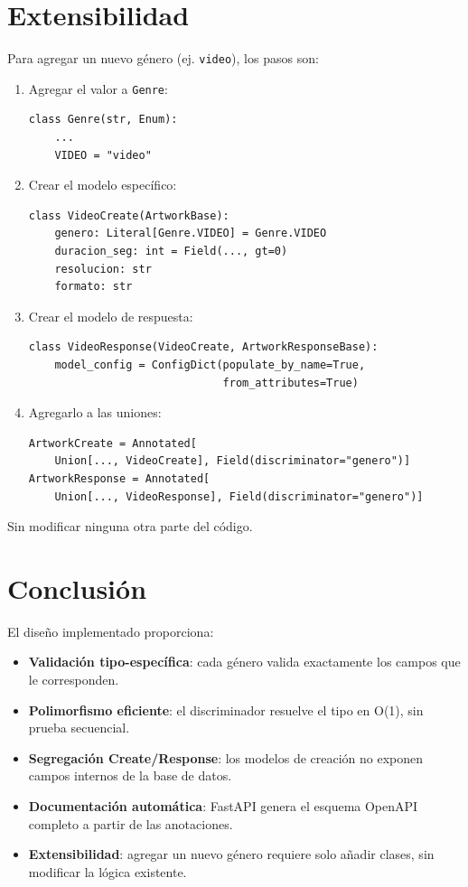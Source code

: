 \documentclass[12pt,a4paper]{article}
\begin{document}
\section{Extensibilidad}

Para agregar un nuevo género (ej. \texttt{video}), los pasos son:

\begin{enumerate}
    \item Agregar el valor a \texttt{Genre}:
\begin{lstlisting}
class Genre(str, Enum):
    ...
    VIDEO = "video"
\end{lstlisting}
    \item Crear el modelo específico:
\begin{lstlisting}
class VideoCreate(ArtworkBase):
    genero: Literal[Genre.VIDEO] = Genre.VIDEO
    duracion_seg: int = Field(..., gt=0)
    resolucion: str
    formato: str
\end{lstlisting}
    \item Crear el modelo de respuesta:
\begin{lstlisting}
class VideoResponse(VideoCreate, ArtworkResponseBase):
    model_config = ConfigDict(populate_by_name=True,
                              from_attributes=True)
\end{lstlisting}
    \item Agregarlo a las uniones:
\begin{lstlisting}
ArtworkCreate = Annotated[
    Union[..., VideoCreate], Field(discriminator="genero")]
ArtworkResponse = Annotated[
    Union[..., VideoResponse], Field(discriminator="genero")]
\end{lstlisting}
\end{enumerate}

Sin modificar ninguna otra parte del código.

\section{Conclusión}

El diseño implementado proporciona:

\begin{itemize}
    \item \textbf{Validación tipo-específica}: cada género valida exactamente
          los campos que le corresponden.
    \item \textbf{Polimorfismo eficiente}: el discriminador resuelve el tipo
          en O(1), sin prueba secuencial.
    \item \textbf{Segregación Create/Response}: los modelos de creación no
          exponen campos internos de la base de datos.
    \item \textbf{Documentación automática}: FastAPI genera el esquema
          OpenAPI completo a partir de las anotaciones.
    \item \textbf{Extensibilidad}: agregar un nuevo género requiere solo
          añadir clases, sin modificar la lógica existente.
\end{itemize}
\end{document}

